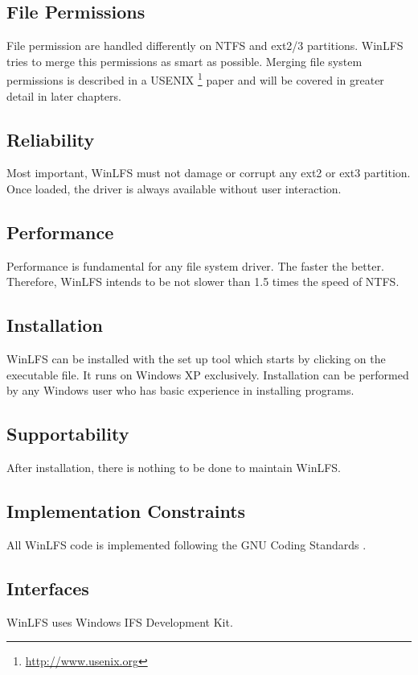 \subsection{File Permissions}
File permission are handled differently on NTFS and ext2/3 partitions. WinLFS tries to merge this permissions as smart as possible. Merging file system permissions is described in a USENIX \footnote{\url{http://www.usenix.org}} paper \cite{mergeFS} and will be covered in greater detail in later chapters.

\subsection{Reliability}
Most important, WinLFS must not damage or corrupt any ext2 or ext3 partition. Once loaded, the driver is always available without user interaction. 

\subsection{Performance}
Performance is fundamental for any file system driver. The faster the better. Therefore, WinLFS intends to be not slower than 1.5 times the speed of NTFS.

\subsection{Installation}
WinLFS can be installed with the set up tool which starts by clicking on the executable file. It runs on Windows XP exclusively. Installation can be performed by any Windows user who has basic experience in installing programs.

\subsection{Supportability}
After installation, there is nothing to be done to maintain WinLFS.

\subsection{Implementation Constraints}
All WinLFS code is implemented following the GNU Coding Standards \cite{codeStd}.

\subsection{Interfaces}
WinLFS uses Windows IFS Development Kit.

